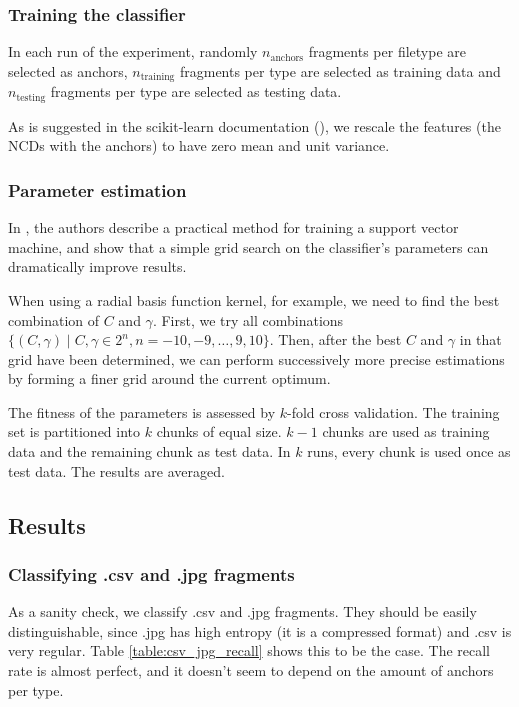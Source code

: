 \subsubsection{Training the classifier}

In each run of the experiment, randomly $n_{\text{anchors}}$ fragments per
filetype are selected as anchors, $n_{\text{training}}$ fragments per type are
selected as training data and $n_{\text{testing}}$ fragments per type are
selected as testing data.

As is suggested in the scikit-learn documentation (\cite{Pedregosa2011}),
we rescale the features (the NCDs with the anchors) to have zero mean and
unit variance.


\subsubsection{Parameter estimation}

In \cite{Chih2008}, the authors describe a practical method for training
a support vector machine, and show that a simple grid search on the
classifier's parameters can dramatically improve results.

When using a radial basis function kernel, for example, we need to find
the best combination of $C$ and $\gamma$. First, we try all combinations
$ \{ (C, \gamma) \mid C, \gamma \in 2^{n}, n = -10, -9, \dots, 9, 10 \}$.
Then, after the best $C$ and $\gamma$ in that grid have been determined,
we can perform successively more precise estimations by forming a finer
grid around the current optimum.

The fitness of the parameters is assessed by $k$-fold cross validation.
The training set is partitioned into $k$ chunks of equal size. $k - 1$
chunks are used as training data and the remaining chunk as test data. In
$k$ runs, every chunk is used once as test data. The results are averaged.

\subsection{Results}

\subsubsection{Classifying .csv and .jpg fragments}

As a sanity check, we classify .csv and .jpg fragments. They should be
easily distinguishable, since .jpg has high entropy (it is a compressed
format) and .csv is very regular. Table \ref{table:csv_jpg_recall} shows
this to be the case. The recall rate is almost perfect, and it doesn't
seem to depend on the amount of anchors per type.

